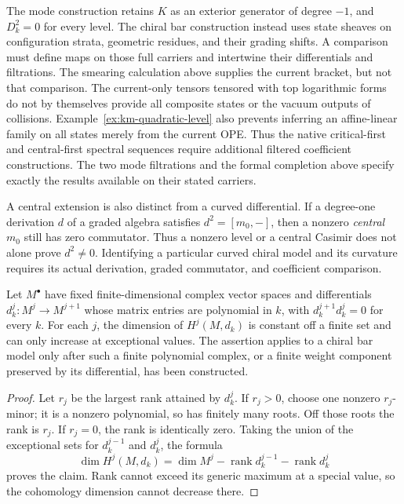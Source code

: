 \begin{remark}
\label{rem:bicomplex-interpretation}
The mode construction retains $K$ as an exterior generator of degree $-1$,
and $D_k^2=0$ for every level.  The chiral bar construction instead uses
state sheaves on configuration strata, geometric residues, and their
grading shifts.  A comparison must define maps on those full carriers and
intertwine their differentials and filtrations.  The smearing calculation
above supplies the current bracket, but not that comparison.
The current-only tensors tensored with top logarithmic forms do not by
themselves provide all composite states or the vacuum outputs of collisions.
Example~\ref{ex:km-quadratic-level} also prevents inferring an affine-linear
family on all states merely from the current OPE.
Thus the native critical-first and central-first spectral sequences require
additional filtered coefficient constructions.  The two mode filtrations
and the formal completion above specify exactly the results available on
their stated carriers.

A central extension is also distinct from a curved differential.
If a degree-one derivation $d$ of a graded algebra satisfies $d^2=[m_0,-]$,
then a nonzero \emph{central} $m_0$ still has zero commutator.
Thus a nonzero level or a central Casimir does not alone prove $d^2\ne0$.
Identifying a particular curved chiral model and its curvature requires
its actual derivation, graded commutator, and coefficient comparison.
\end{remark}

\begin{theorem}\label{thm:bar-cohomology-level-independence}
Let $M^\bullet$ have fixed finite-dimensional complex vector spaces and
differentials $d_k^j:M^j\to M^{j+1}$ whose matrix entries are polynomial in
$k$, with $d_k^{j+1}d_k^j=0$ for every $k$.
For each $j$, the dimension of $H^j(M,d_k)$ is constant off a finite set
and can only increase at exceptional values.
The assertion applies to a chiral bar model only after such a finite
polynomial complex, or a finite weight component preserved by its
differential, has been constructed.
\end{theorem}
\begin{proof}
Let $r_j$ be the largest rank attained by $d_k^j$.
If $r_j>0$, choose one nonzero $r_j$-minor; it is a nonzero polynomial, so
has finitely many roots.  Off those roots the rank is $r_j$.
If $r_j=0$, the rank is identically zero.
Taking the union of the exceptional sets for $d_k^{j-1}$ and $d_k^j$,
the formula
\[
\dim H^j(M,d_k)=\dim M^j-\operatorname{rank}d_k^{j-1}
-\operatorname{rank}d_k^j
\]
proves the claim.  Rank cannot exceed its generic maximum at a special
value, so the cohomology dimension cannot decrease there.
\end{proof}

